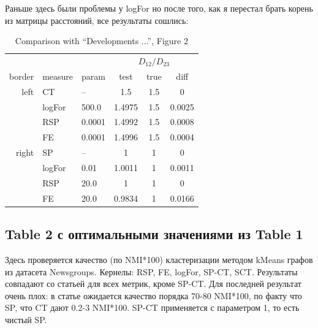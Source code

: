 \documentclass{article}
\begin{document}
Раньше здесь были проблемы у logFor но после того, как я перестал брать корень из матрицы расстояний, все результаты сошлись:

\begin{table}[H]
\centering
\caption{Comparison with ``Developments ...'', Figure 2}
\label{my-label}
\begin{tabular}{rll|cc|c}
       &         &        & \multicolumn{3}{c}{$D_{12} / D_{23}$} \\
border & measure & param  & test   & true & diff   \\
       \hline
left   & CT      & --     & 1.5    & 1.5  & 0      \\
       & logFor  & 500.0  & 1.4975 & 1.5  & 0.0025 \\
       & RSP     & 0.0001 & 1.4992 & 1.5  & 0.0008 \\
       & FE      & 0.0001 & 1.4996 & 1.5  & 0.0004 \\
       \hline
right  & SP      & --     & 1      & 1    & 0      \\
       & logFor  & 0.01   & 1.0011 & 1    & 0.0011 \\
       & RSP     & 20.0   & 1      & 1    & 0      \\
       & FE      & 20.0   & 0.9834 & 1    & 0.0166
\end{tabular}
\end{table}

\subsection{Table 2 с оптимальными значениями из Table 1}
Здесь проверяется качество (по NMI*100) кластеризации методом kMeans графов из датасета Newsgroups. Кернелы: RSP, FE, logFor, SP-CT, SCT. Результаты совпадают со статьей для всех метрик, кроме SP-CT. Для последней результат очень плох: в статье ожидается качество порядка 70-80 NMI*100, по факту что SP, что CT дают 0.2-3 NMI*100. SP-CT применяется с параметром 1, то есть чистый SP.
\end{document}
